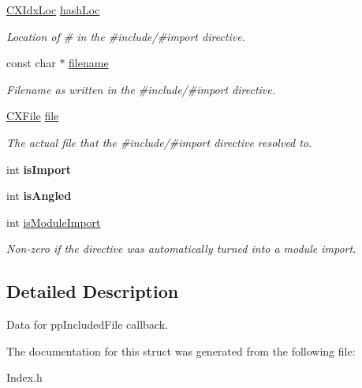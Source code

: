 \begin{DoxyCompactItemize}
\item 
\mbox{\label{structCXIdxIncludedFileInfo_a2138c7f64cb8129d654749a089f50831}} 
\hyperlink{structCXIdxLoc}{C\+X\+Idx\+Loc} \hyperlink{structCXIdxIncludedFileInfo_a2138c7f64cb8129d654749a089f50831}{hash\+Loc}
\begin{DoxyCompactList}\small\item\em Location of \textquotesingle{}\#\textquotesingle{} in the \#include/\#import directive. \end{DoxyCompactList}\item 
\mbox{\label{structCXIdxIncludedFileInfo_ae97be6241f40b1c1bbc2d304678a409f}} 
const char $\ast$ \hyperlink{structCXIdxIncludedFileInfo_ae97be6241f40b1c1bbc2d304678a409f}{filename}
\begin{DoxyCompactList}\small\item\em Filename as written in the \#include/\#import directive. \end{DoxyCompactList}\item 
\mbox{\label{structCXIdxIncludedFileInfo_a99ce5417ea5d75d6f614351f8ba7d8bc}} 
\hyperlink{group__CINDEX__FILES_gacfcea9c1239c916597e2e5b3e109215a}{C\+X\+File} \hyperlink{structCXIdxIncludedFileInfo_a99ce5417ea5d75d6f614351f8ba7d8bc}{file}
\begin{DoxyCompactList}\small\item\em The actual file that the \#include/\#import directive resolved to. \end{DoxyCompactList}\item 
\mbox{\label{structCXIdxIncludedFileInfo_ab6cc97a92d2eacfee24227703a334eae}} 
int {\bfseries is\+Import}
\item 
\mbox{\label{structCXIdxIncludedFileInfo_a899ca01c27e452a2716654c25b6e5fec}} 
int {\bfseries is\+Angled}
\item 
\mbox{\label{structCXIdxIncludedFileInfo_a9e84d589a428a85c4b8d62eae5e058f7}} 
int \hyperlink{structCXIdxIncludedFileInfo_a9e84d589a428a85c4b8d62eae5e058f7}{is\+Module\+Import}
\begin{DoxyCompactList}\small\item\em Non-\/zero if the directive was automatically turned into a module import. \end{DoxyCompactList}\end{DoxyCompactItemize}


\subsection{Detailed Description}
Data for pp\+Included\+File callback. 

The documentation for this struct was generated from the following file\+:\begin{DoxyCompactItemize}
\item 
Index.\+h\end{DoxyCompactItemize}
